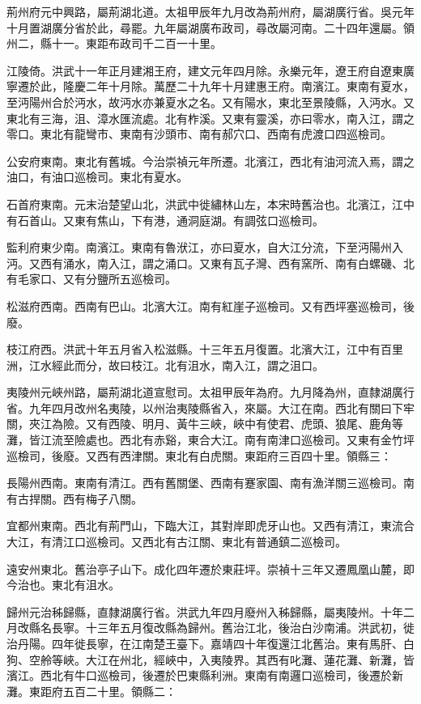 荊州府元中興路，屬荊湖北道。太祖甲辰年九月改為荊州府，屬湖廣行省。吳元年十月置湖廣分省於此，尋罷。九年屬湖廣布政司，尋改屬河南。二十四年還屬。領州二，縣十一。東距布政司千二百一十里。

江陵倚。洪武十一年正月建湘王府，建文元年四月除。永樂元年，遼王府自遼東廣寧遷於此，隆慶二年十月除。萬歷二十九年十月建惠王府。南濱江。東南有夏水，至沔陽州合於沔水，故沔水亦兼夏水之名。又有陽水，東北至景陵縣，入沔水。又東北有三海，沮、漳水匯流處。北有柞溪。又東有靈溪，亦曰零水，南入江，謂之零口。東北有龍彎市、東南有沙頭市、南有郝穴口、西南有虎渡口四巡檢司。

公安府東南。東北有舊城。今治崇禎元年所遷。北濱江，西北有油河流入焉，謂之油口，有油口巡檢司。東北有夏水。

石首府東南。元末治楚望山北，洪武中徙繡林山左，本宋時舊治也。北濱江，江中有石首山。又東有焦山，下有港，通洞庭湖。有調弦口巡檢司。

監利府東少南。南濱江。東南有魯洑江，亦曰夏水，自大江分流，下至沔陽州入沔。又西有涌水，南入江，謂之涌口。又東有瓦子灣、西有窯所、南有白螺磯、北有毛家口、又有分鹽所五巡檢司。

松滋府西南。西南有巴山。北濱大江。南有紅崖子巡檢司。又有西坪塞巡檢司，後廢。

枝江府西。洪武十年五月省入松滋縣。十三年五月復置。北濱大江，江中有百里洲，江水經此而分，故曰枝江。北有沮水，南入江，謂之沮口。

夷陵州元峽州路，屬荊湖北道宣慰司。太祖甲辰年為府。九月降為州，直隸湖廣行省。九年四月改州名夷陵，以州治夷陵縣省入，來屬。大江在南。西北有關曰下牢關，夾江為險。又有西陵、明月、黃牛三峽，峽中有使君、虎頭、狼尾、鹿角等灘，皆江流至險處也。西北有赤谿，東合大江。南有南津口巡檢司。又東有金竹坪巡檢司，後廢。又西有西津關。東北有白虎關。東距府三百四十里。領縣三：

長陽州西南。東南有清江。西有舊關堡、西南有蹇家園、南有漁洋關三巡檢司。南有古捍關。西有梅子八關。

宜都州東南。西北有荊門山，下臨大江，其對岸即虎牙山也。又西有清江，東流合大江，有清江口巡檢司。又西北有古江關、東北有普通鎮二巡檢司。

遠安州東北。舊治亭子山下。成化四年遷於東莊坪。崇禎十三年又遷鳳凰山麓，即今治也。東北有沮水。

歸州元治秭歸縣，直隸湖廣行省。洪武九年四月廢州入秭歸縣，屬夷陵州。十年二月改縣名長寧。十三年五月復改縣為歸州。舊治江北，後治白沙南浦。洪武初，徙治丹陽。四年徙長寧，在江南楚王臺下。嘉靖四十年復還江北舊治。東有馬肝、白狗、空舲等峽。大江在州北，經峽中，入夷陵界。其西有叱灘、蓮花灘、新灘，皆濱江。西北有牛口巡檢司，後遷於巴東縣利洲。東南有南邏口巡檢司，後遷於新灘。東距府五百二十里。領縣二：

